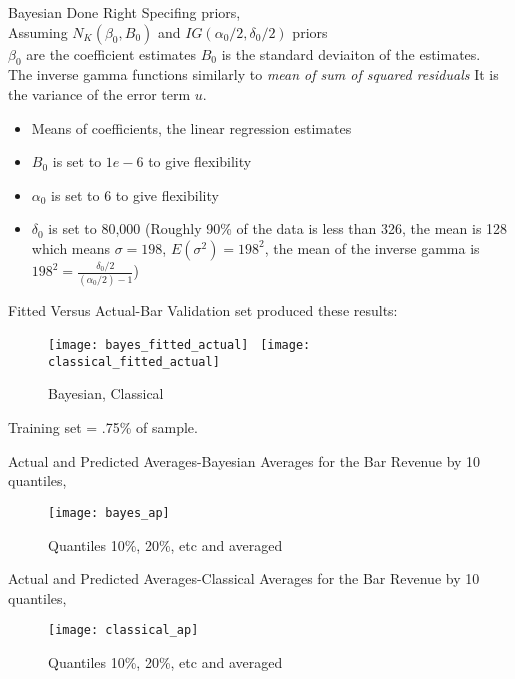 \documentclass{beamer}
\begin{document}
\begin{frame}{Bayesian Done Right}
	Specifing priors,\\
	Assuming $ N_K(\beta_0, B_0) $ and $ IG(\alpha_0/2, \delta_0/2) $ priors \\
	$ \beta_0  $ are the coefficient estimates $ B_0 $ is the standard deviaiton of the estimates. \\
	 The inverse gamma functions similarly to \textit{mean of sum of squared residuals} It is the variance of the error term $ u $. 
	\begin{itemize}
		\item Means of coefficients, the linear regression estimates
		\item $ B_0 $ is set to $ 1e-6 $ to give flexibility
		\item $ \alpha_0 $ is set to 6 to give flexibility
		\item $ \delta_0 $ is set to 80,000 (Roughly 90\% of the data is less than 326, the mean is 128 which means $ \sigma = 198 $, $ E(\sigma^2) = 198^2 $, the mean of the inverse gamma is $ 198^2 = \frac{\delta_0 /2}{(\alpha_0 / 2) - 1} $)
	\end{itemize}

\end{frame}

\begin{frame}{Fitted Versus Actual-Bar}
	Validation set produced these results:
	\begin{figure}
	\texttt{[image: bayes\_fitted\_actual]} \ \texttt{[image: classical\_fitted\_actual]}
\caption{Bayesian, Classical}
\end{figure}
Training set = .75\% of sample. 
\end{frame}


\begin{frame}{Actual and Predicted Averages-Bayesian}
	Averages for the Bar Revenue by 10 quantiles, 
	\begin{figure}
		\texttt{[image: bayes\_ap]}
		\caption{Quantiles 10\%, 20\%, etc and averaged}
	\end{figure}
\end{frame}


\begin{frame}{Actual and Predicted Averages-Classical}
	Averages for the Bar Revenue by 10 quantiles, 
	\begin{figure}
	\texttt{[image: classical\_ap]}
	\caption{Quantiles 10\%, 20\%, etc and averaged}
	\end{figure}
\end{frame}
\end{document}
